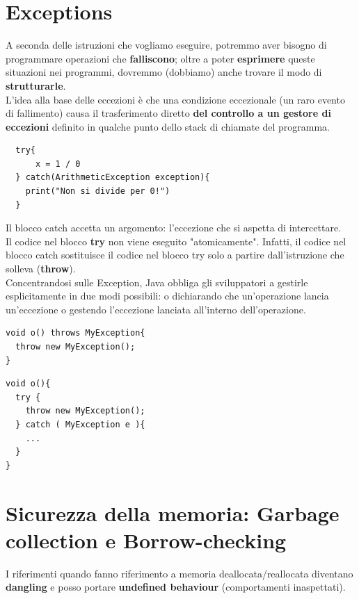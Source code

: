 \documentclass[a4paper,12pt]{article}
\begin{document}
\section{Exceptions}
A seconda delle istruzioni che vogliamo eseguire, potremmo aver bisogno di programmare operazioni
che \textbf{falliscono}; oltre a poter \textbf{esprimere} queste situazioni nei programmi, dovremmo (dobbiamo) anche trovare il modo di \textbf{strutturarle}.\\
L'idea alla base delle eccezioni è che una condizione eccezionale (un raro
evento di fallimento) causa il trasfer\textbf{}imento diretto \textbf{del controllo a un gestore di
eccezioni} definito in qualche punto dello stack di chiamate del programma.
\begin{lstlisting}
  try{
      x = 1 / 0
  } catch(ArithmeticException exception){
    print("Non si divide per 0!")
  }
\end{lstlisting}
Il blocco catch accetta un argomento: l'eccezione che si aspetta di intercettare.\\
Il codice nel blocco \textbf{try} non viene eseguito "atomicamente". Infatti, il codice nel
blocco catch sostituisce il codice nel blocco try solo a partire dall'istruzione che solleva (\textbf{throw}).\\
Concentrandosi sulle Exception, Java obbliga gli sviluppatori a gestirle
esplicitamente in due modi possibili: o dichiarando che un'operazione lancia
un'eccezione o gestendo l'eccezione lanciata all'interno dell'operazione.\\
\begin{minipage}{0.48\textwidth}
\begin{lstlisting}
void o() throws MyException{
  throw new MyException();
}
\end{lstlisting}
\end{minipage}
\hfill
\begin{minipage}{0.48\textwidth}
\begin{lstlisting}
void o(){
  try {
    throw new MyException();
  } catch ( MyException e ){
    ...
  }
}
\end{lstlisting}
\end{minipage}
\section{Sicurezza della memoria: Garbage collection e Borrow-checking}
I riferimenti quando fanno riferimento a memoria deallocata/reallocata diventano \textbf{dangling} e posso portare \textbf{undefined behaviour} (comportamenti inaspettati).\\
\end{document}
